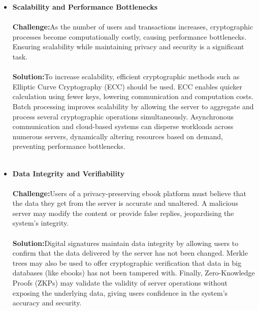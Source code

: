 \documentclass[12pt]{article}
\begin{document}
\begin{itemize}
	\item \textbf{Scalability and Performance Bottlenecks}\\\\
	\textbf{Challenge:}As the number of users and transactions increases, cryptographic processes become computationally costly, causing performance bottlenecks. Ensuring scalability while maintaining privacy and security is a significant task.\\\\
	\textbf{Solution:}To increase scalability, efficient cryptographic methods such as Elliptic Curve Cryptography (ECC) should be used. ECC enables quicker calculation using fewer keys, lowering communication and computation costs. 
	Batch processing improves scalability by allowing the server to aggregate and process several cryptographic operations simultaneously. Asynchronous communication and cloud-based systems can disperse workloads across numerous servers, dynamically altering resources based on demand, preventing performance bottlenecks.
	\\\\
   \item \textbf{Data Integrity and Verifiability}\\\\
   \textbf{Challenge:}Users of a privacy-preserving ebook platform must believe that the data they get from the server is accurate and unaltered. A malicious server may modify the content or provide false replies, jeopardising the system's integrity.
   \\\\
   \textbf{Solution:}Digital signatures maintain data integrity by allowing users to confirm that the data delivered by the server has not been changed. Merkle trees may also be used to offer cryptographic verification that data in big databases (like ebooks) has not been tampered with. Finally, Zero-Knowledge Proofs (ZKPs) may validate the validity of server operations without exposing the underlying data, giving users confidence in the system's accuracy and security.\\\\
   

\end{itemize}
\end{document}
